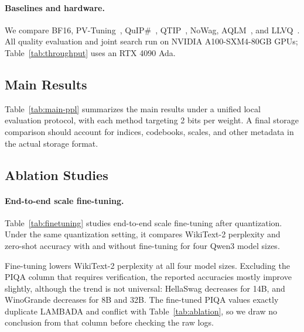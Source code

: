 \paragraph{Baselines and hardware.} We compare BF16, PV-Tuning~\cite{pvtuning}, QuIP\#~\cite{quipsharp}, QTIP~\cite{qtip}, NoWag, AQLM~\cite{aqlm}, and LLVQ~\cite{llvq}. All quality evaluation and joint search run on NVIDIA A100-SXM4-80GB GPUs; Table~\ref{tab:throughput} uses an RTX 4090 Ada.

\subsection{Main Results}

Table~\ref{tab:main-ppl} summarizes the main results under a unified local evaluation protocol, with each method targeting 2 bits per weight. A final storage comparison should account for indices, codebooks, scales, and other metadata in the actual storage format.


\subsection{Ablation Studies}

\paragraph{End-to-end scale fine-tuning.} Table~\ref{tab:finetuning} studies end-to-end scale fine-tuning after quantization. Under the same quantization setting, it compares WikiText-2 perplexity and zero-shot accuracy with and without fine-tuning for four Qwen3 model sizes.


Fine-tuning lowers WikiText-2 perplexity at all four model sizes. Excluding the PIQA column that requires verification, the reported accuracies mostly improve slightly, although the trend is not universal: HellaSwag decreases for 14B, and WinoGrande decreases for 8B and 32B. The fine-tuned PIQA values exactly duplicate LAMBADA and conflict with Table~\ref{tab:ablation}, so we draw no conclusion from that column before checking the raw logs.

